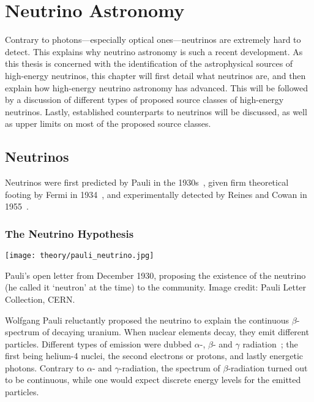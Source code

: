 \chapter{Neutrino Astronomy}\label{theory}

Contrary to photons---especially optical ones---neutrinos are extremely hard to detect. This explains why neutrino astronomy is such a recent development. As this thesis is concerned with the identification of the astrophysical sources of high-energy neutrinos, this chapter will first detail what neutrinos are, and then explain how high-energy neutrino astronomy has advanced. This will be followed by a discussion of different types of proposed source classes of high-energy neutrinos. Lastly, established counterparts to neutrinos will be discussed, as well as upper limits on most of the proposed source classes.

\section{Neutrinos}
Neutrinos were first predicted by Pauli in the 1930s~, given firm theoretical footing by Fermi in 1934~, and experimentally detected by Reines and Cowan in 1955~.

\subsection{The Neutrino Hypothesis}\label{neutrino_hypothesis}

\begin{marginfigure}
    \texttt{[image: theory/pauli\_neutrino.jpg]}
    \caption[Pauli's letter proposing the neutrino]{Pauli's open letter from December 1930, proposing the existence of the neutrino (he called it `neutron' at the time) to the community. Image credit: Pauli Letter Collection, CERN.}
\end{marginfigure}

Wolfgang Pauli reluctantly proposed the neutrino to explain the continuous $\beta$-spectrum of decaying uranium. When nuclear elements decay, they emit different particles. Different types of emission were dubbed $\alpha$-, $\beta$- and $\gamma$ radiation~; the first being helium-4 nuclei, the second electrons or protons, and lastly energetic photons. Contrary to $\alpha$- and $\gamma$-radiation, the spectrum of $\beta$-radiation turned out to be continuous, while one would expect discrete energy levels for the emitted particles.

